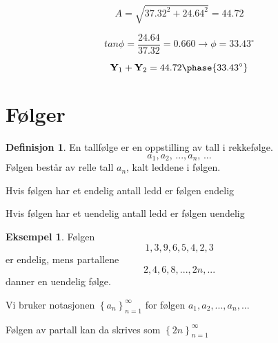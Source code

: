 \documentclass[11pt]{article}
\theoremstyle{definition}
\newtheorem{mindef}{Definisjon}[section]
\newenvironment{fmindef}
{\begin{mdframed}[style=minstil]\begin{mindef}}
		{\end{mindef}\end{mdframed}}
\theoremstyle{definition}
\newtheorem{mitteks}{Eksempel}[section]
\newenvironment{fmitteks}
{\begin{mdframed}[style=minstil]\begin{mitteks}}
		{\end{mitteks}\end{mdframed}}
\theoremstyle{definition}
\theoremstyle{definition}
\theoremstyle{definition}
\theoremstyle{definition}
\begin{document}
		\[A=\sqrt{37.32^2+24.64^2}=44.72\]
		
		\[tan\phi=\frac{24.64}{37.32}=0.660 \rightarrow \phi=33.43^{\circ}\]
		
		\[\textbf{Y}_1+\textbf{Y}_2=44.72\phase{33.43^{\circ}}\]	


		\newpage
		\section{Følger}
		
		\begin{fmindef}
			En tallfølge er en oppstilling av tall i rekkefølge. 
			\[a_1,a_2,\, ...,a_n,\, ...\]
			Følgen består av relle tall \(a_n\), kalt leddene i følgen. 
		\end{fmindef}
		
		Hvis følgen har et endelig antall ledd er følgen endelig
		
		Hvis følgen har et uendelig antall ledd er følgen uendelig
		
		\begin{fmitteks}
			Følgen \[1,3,9,6,5,4,2,3\]
			er endelig, mens partallene 
			\[2,4,6,8,...,2n,...\]
			danner en uendelig følge.
		\end{fmitteks}
		
		Vi bruker notasjonen \(\left\lbrace a_n \right\rbrace^{\infty}_{n=1}\) for følgen \(a_1,a_2,...,a_n,...\) \vspace{8pt}
		
		Følgen av partall kan da skrives som \(\left\lbrace 2n \right\rbrace^{\infty}_{n=1} \)
		
		\newpage
		
\end{document}
